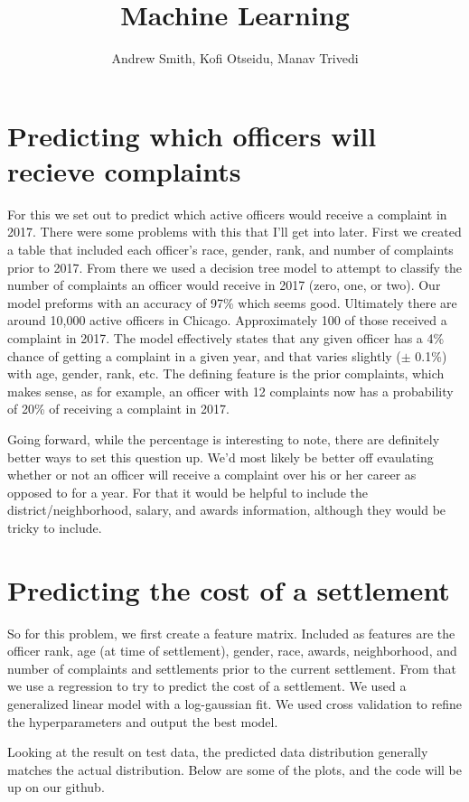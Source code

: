 \documentclass[11pt]{article}
\author{Andrew Smith, Kofi Otseidu, Manav Trivedi}
\title{Machine Learning}
\begin{document}
\maketitle

\section{Predicting which officers will recieve complaints}
For this we set out to predict which active officers would receive a complaint in 2017. There were some problems with this that I'll get into later. First we created a table that included each officer's race, gender, rank, and number of complaints prior to 2017. From there we used a decision tree model to attempt to classify the number of complaints an officer would receive in 2017 (zero, one, or two). Our model preforms with an accuracy of 97\% which seems good. Ultimately there are around 10,000 active officers in Chicago. Approximately 100 of those received a complaint in 2017. The model effectively states that any given officer has a 4\% chance of getting a complaint in a given year, and that varies slightly ($\pm$ 0.1\%) with age, gender, rank, etc. The defining feature is the prior complaints, which makes sense, as for example, an officer with 12 complaints now has a probability of 20\% of receiving a complaint in 2017.

Going forward, while the percentage is interesting to note, there are definitely better ways to set this question up. We'd most likely be better off evaulating whether or not an officer will receive a complaint over his or her career as opposed to for a year. For that it would be helpful to include the district/neighborhood, salary, and awards information, although they would be tricky to include.


\section{Predicting the cost of a settlement}
So for this problem, we first create a feature matrix. Included as features are the officer rank, age (at time of settlement), gender, race, awards, neighborhood, and number of complaints and settlements prior to the current settlement. From that we use a regression to try to predict the cost of a settlement. We used a generalized linear model with a log-gaussian fit. We used cross validation to refine the hyperparameters and output the best model.

Looking at the result on test data, the predicted data distribution generally matches the actual distribution. Below are some of the plots, and the code will be up on our github.
\end{document}
